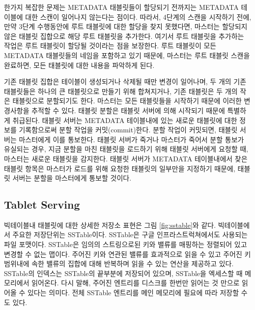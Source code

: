 \documentclass[twocolumn]{article}
\begin{document}
한가지 복잡한 문제는 METADATA 태블릿들이 할당되기 전까지는 METADATA 테이블에 대한 스캔이 일어나지 않는다는 점이다.
따라서, 4단계의 스캔을 시작하기 전에, 만약 3단계 수행동안에 루트 태블릿에 대한 할당을 찾지 못했다면, 마스터는 할당되지 않은 태블릿 집합으로 해당 루트 태블릿을 추가한다. 여기서 루트 태블릿을 추가하는 작업은 루트 태블릿이 할당될 것이라는 점을 보장한다.
루트 태블릿이 모든 METADATA 태블릿들의 네임을 포함하고 있기 때문에, 마스터는 루트 태블릿 스캔을 완료하면, 모든 태블릿에 대한 내용을 파악하게 된다.

기존 태블릿 집합은 테이블이 생성되거나 삭제될 때만 변경이 일어나며,
두 개의 기존 태블릿들은 하나의 큰 태블릿으로 만들기 위해 합쳐지거나, 기존 태블릿은 두 개의 작은 태블릿으로 분할되기도 한다.
마스터는 모든 태블릿들을 시작하기 때문에 이러한 변경사항을 추적할 수 있다.
태블릿 분할은  태블릿 서버에 의해 시작되기 때문에 특별하게 취급된다.
태블릿 서버는 METADATA 테이블내에 있는 새로운 태블릿에 대한 정보를 기록함으로써 분할 작업을 커밋(commit)한다.
분할 작업이 커밋되면, 태블릿 서버는 마스터에게 이를 통보한다.
태블릿 서버가 죽거나 마스터가 죽어서 분할 통보가 유실되는 경우,
지금 분할을 마친 태블릿을 로드하기 위해 태블릿 서버에게 요청할 때, 마스터는 새로운 태블릿을 감지한다.
태블릿 서버가 METADATA 테이블내에서 찾은 태블릿 항목은 마스터가 로드를 위해 요청한 태블릿의 일부만을 지정하기 때문에, 
태블릿 서버는 분할을 마스터에게 통보할 것이다.


\subsection{Tablet Serving}

빅테이블내 태블릿에 대한 상세한 저장소 표현은 그림 \ref{fig:sstable}와 같다.
빅테이블에서 주요한 저장단위는 SSTable이다. SSTable은 구글 인프라스트럭쳐에서도 사용되는 파일 포맷이다. 
SSTable은 임의의 스트링으로된 키와 밸류를 매핑하는 정렬되어 있고 변경할 수 없는 맵이다. 
주어진 키와 연관된 밸류를 효과적으로 읽을 수 있고 주어진 키 범위내에 속한 밸류의 집합에 대해 반복하며  읽을 수 있는 연산을 제공하고 있다.
SSTable의 인덱스는 SSTable의 끝부분에 저장되어 있으며, SSTable을 엑세스할 때 메모리에서 읽어온다. 
다시 말해, 주어진 엔트리를 디스크를 한번만 읽어는 것 만으로 읽어올 수 있다는 의미다. 
전체 SSTable 엔트리를 메인 메모리에 필요에 따라 저장할 수도 있다.
\end{document}
